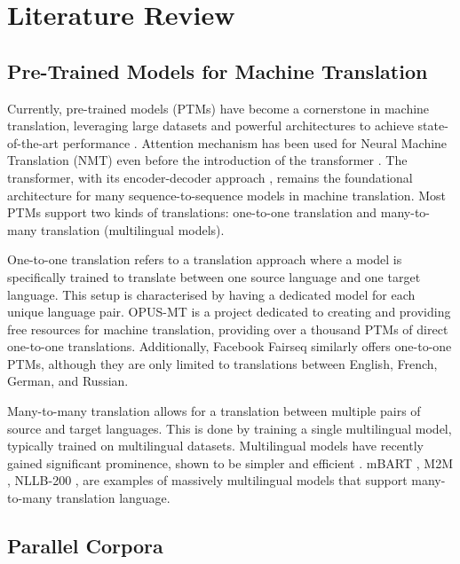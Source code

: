 \documentclass[a4paper, 11pt]{article}
\begin{document}
\section{Literature Review}

\subsection{Pre-Trained Models for Machine Translation}

Currently, pre-trained models (PTMs) have become a cornerstone in machine translation, leveraging large datasets and powerful architectures to achieve state-of-the-art performance \cite{han-2021-ptms}. Attention mechanism has been used for Neural Machine Translation (NMT) \cite{bahdanau-2016-nmt-jointly, luong-2015-effective-attention} even before the introduction of the transformer \cite{vaswani-2017-attention}. The transformer, with its encoder-decoder approach \cite{cho-2014-properties}, remains the foundational architecture for many sequence-to-sequence models in machine translation. Most PTMs support two kinds of translations: one-to-one translation and many-to-many translation (multilingual models).

One-to-one translation refers to a translation approach where a model is specifically trained to translate between one source language and one target language. This setup is characterised by having a dedicated model for each unique language pair. OPUS-MT \cite{tiedemann-2020-opus-mt} is a project dedicated to creating and providing free resources for machine translation, providing over a thousand PTMs of direct one-to-one translations. Additionally, Facebook Fairseq \cite{ott-2019-fairseq} similarly offers one-to-one PTMs, although they are only limited to translations between English, French, German, and Russian.

Many-to-many translation allows for a translation between multiple pairs of source and target languages. This is done by training a single multilingual model, typically trained on multilingual datasets. Multilingual models have recently gained significant prominence, shown to be simpler and efficient \cite{aharoni-2019-massively-multilingual}. mBART \cite{liu-2020-mbart}, M2M \cite{fan-2020-m2m100}, NLLB-200 \cite{nllb200-2020}, are examples of massively multilingual models that support many-to-many translation language.

\subsection{Parallel Corpora}
\end{document}
